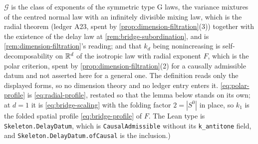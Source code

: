 \begin{definition}
{$\mathcal{G}$ is the class of exponents of the symmetric type G laws, the variance mixtures of
the centred normal law with an infinitely divisible mixing law, which is the radial theorem
(ledger A23, spent by \ref{prop:dimension-filtration}(3)) together with the existence of the
delay law at \ref{rem:bridge-subordination}, and is \ref{rem:dimension-filtration}'s reading;
and that $k_d$ being nonincreasing is self-decomposability on $\mathbb{R}^d$ of the isotropic law with
radial exponent $F$, which is the polar criterion, spent by \ref{prop:dimension-filtration}(2)
for a causally admissible datum and not asserted here for a general one. The definition reads
only the displayed forms, so no dimension theory and no ledger entry enters it. \ref{eq:polar-profile} is \ref{eq:radial-profile}, restated so that the lemma
below stands on its own; at $d = 1$ it is \ref{eq:bridge-scaling} with the folding factor
$2 = |S^0|$ in place, so $k_1$ is the folded spatial profile \ref{eq:bridge-profile} of $F$. The
Lean type is \texttt{Skeleton.DelayDatum}, which is \texttt{CausalAdmissible} without its
\texttt{k\_antitone} field, and \texttt{Skeleton.DelayDatum.ofCausal} is the inclusion.)}
\end{definition}

